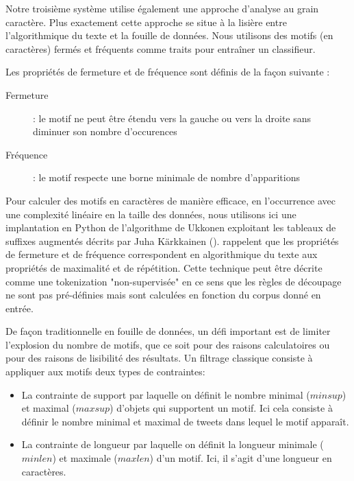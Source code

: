  Notre troisième système utilise également une approche d'analyse au grain caractère. Plus exactement cette approche se situe à la lisière entre l'algorithmique du texte et la fouille de données.
 Nous utilisons des motifs (en caractères) fermés et fréquents comme traits pour entraîner un classifieur.

 Les propriétés de fermeture et de fréquence sont définis de la façon suivante :%
\begin{description}
\item[Fermeture]: le motif ne peut être étendu vers la gauche ou vers la droite sans diminuer son nombre d'occurences
\item[Fréquence]: le motif respecte une borne minimale de nombre d'apparitions
\end{description}

 Pour calculer des motifs en caractères de manière efficace, en l'occurrence avec une complexité linéaire en la taille des données, nous utilisons ici une implantation en Python de l'algorithme de Ukkonen \cite{Ukkonen-2009} exploitant les tableaux de suffixes augmentés décrits par Juha Kärkkainen (\cite{Karkka-2006}).
 \cite{Buscaldi-2017} rappelent que les propriétés de fermeture et de fréquence correspondent en algorithmique du texte aux propriétés de maximalité et de répétition.
 Cette technique peut être décrite comme une tokenization "non-supervisée" en ce sens que les règles de découpage ne sont pas pré-définies mais sont calculées en fonction du corpus donné en entrée. %
 
 De façon traditionnelle en fouille de données, un défi important est de limiter l'explosion du nombre de motifs, que ce soit pour des raisons calculatoires ou pour des raisons de lisibilité des résultats.%
 Un filtrage classique consiste à appliquer aux motifs deux types de contraintes:
\begin{itemize}
  \item La contrainte de support par laquelle on définit le nombre minimal ($minsup$) et maximal ($maxsup$) d'objets qui supportent un motif. Ici cela consiste à définir le nombre minimal et maximal de tweets dans lequel le motif apparaît.
  \item La contrainte de longueur par laquelle on définit la longueur minimale ($minlen$) et maximale ($maxlen$) d'un motif. Ici, il s'agit d'une longueur en caractères.
\end{itemize}

